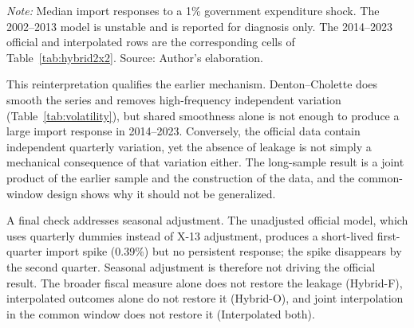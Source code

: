 \documentclass[11pt,a4paper]{article}
\begin{document}
\begin{table}[htbp]
\centering
\small
\caption{Period decomposition of the import response, order 1 (percent)}
\label{tab:period}
\par\vspace{0.3em}
\begin{minipage}{0.95\textwidth}
\footnotesize\textit{Note:} Median import responses to a 1\% government expenditure shock. The 2002--2013 model is unstable and is reported for diagnosis only. The 2014--2023 official and interpolated rows are the corresponding cells of Table~\ref{tab:hybrid2x2}. Source: Author's elaboration.
\end{minipage}
\end{table}

This reinterpretation qualifies the earlier mechanism. Denton--Cholette does smooth the series and removes high-frequency independent variation (Table~\ref{tab:volatility}), but shared smoothness alone is not enough to produce a large import response in 2014--2023. Conversely, the official data contain independent quarterly variation, yet the absence of leakage is not simply a mechanical consequence of that variation either. The long-sample result is a joint product of the earlier sample and the construction of the data, and the common-window design shows why it should not be generalized.

A final check addresses seasonal adjustment. The unadjusted official model, which uses quarterly dummies instead of X-13 adjustment, produces a short-lived first-quarter import spike (0.39\%) but no persistent response; the spike disappears by the second quarter. Seasonal adjustment is therefore not driving the official result. The broader fiscal measure alone does not restore the leakage (Hybrid-F), interpolated outcomes alone do not restore it (Hybrid-O), and joint interpolation in the common window does not restore it (Interpolated both).
\end{document}
